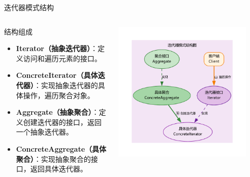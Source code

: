 \documentclass[UTF8,aspectratio=169]{beamer}
\begin{document}
\begin{frame}{迭代器模式结构}
    \begin{columns}
        \begin{column}{0.38\textwidth}
            \begin{ytublock}{结构组成}
                \begin{itemize}
                    \item \textbf{Iterator（抽象迭代器）}：定义访问和遍历元素的接口。
                    \item \textbf{ConcreteIterator（具体迭代器）}：实现抽象迭代器的具体操作，遍历聚合对象。
                    \item \textbf{Aggregate（抽象聚合）}：定义创建迭代器的接口，返回一个抽象迭代器。
                    \item \textbf{ConcreteAggregate（具体聚合）}：实现抽象聚合的接口，返回具体迭代器。
                \end{itemize}
            \end{ytublock}
        \end{column}
        \begin{column}{0.58\textwidth}
            \begin{center}
                \includegraphics[width=0.9\textwidth]{images/iterator_pattern.pdf}
            \end{center}
        \end{column}
    \end{columns}
\end{frame}
\end{document}
